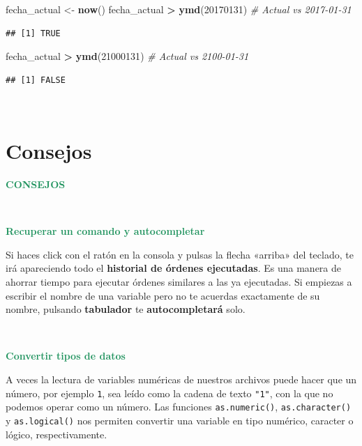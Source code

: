 \documentclass[11pt,]{book}
\newenvironment{Shaded}{\begin{snugshade}}{\end{snugshade}}
\newcommand{\CommentTok}[1]{\textcolor[rgb]{0.37,0.37,0.37}{\textit{#1}}}
\newcommand{\DecValTok}[1]{\textcolor[rgb]{0.06,0.06,0.06}{#1}}
\newcommand{\KeywordTok}[1]{\textcolor[rgb]{0.27,0.27,0.27}{\textbf{#1}}}
\newcommand{\NormalTok}[1]{#1}
\newcommand{\OperatorTok}[1]{\textcolor[rgb]{0.43,0.43,0.43}{\textbf{#1}}}
\newcommand{\StringTok}[1]{\textcolor[rgb]{0.5,0.5,0.5}{#1}}
\begin{document}
\begin{Shaded}
\begin{Highlighting}[]
\NormalTok{fecha_actual <-}\StringTok{ }\KeywordTok{now}\NormalTok{()}
\NormalTok{fecha_actual }\OperatorTok{>}\StringTok{ }\KeywordTok{ymd}\NormalTok{(}\DecValTok{20170131}\NormalTok{) }\CommentTok{# Actual vs 2017-01-31}
\end{Highlighting}
\end{Shaded}

\begin{verbatim}
## [1] TRUE
\end{verbatim}

\begin{Shaded}
\begin{Highlighting}[]
\NormalTok{fecha_actual }\OperatorTok{>}\StringTok{ }\KeywordTok{ymd}\NormalTok{(}\DecValTok{21000131}\NormalTok{) }\CommentTok{# Actual vs 2100-01-31}
\end{Highlighting}
\end{Shaded}

\begin{verbatim}
## [1] FALSE
\end{verbatim}

~

\hypertarget{consejos-2}{%
\section{Consejos}\label{consejos-2}}

\textbf{\textcolor{#20935E}{CONSEJOS}}

~

\textbf{\textcolor{#20935E}{Recuperar un comando y autocompletar}}

Si haces click con el ratón en la consola y pulsas la flecha «arriba» del teclado, te irá apareciendo todo el \textbf{historial de órdenes ejecutadas}. Es una manera de ahorrar tiempo para ejecutar órdenes similares a las ya ejecutadas. Si empiezas a escribir el nombre de una variable pero no te acuerdas exactamente de su nombre, pulsando \textbf{tabulador} te \textbf{autocompletará} solo.

~

\textbf{\textcolor{#20935E}{Convertir tipos de datos}}

A veces la lectura de variables numéricas de nuestros archivos puede hacer que un número, por ejemplo \texttt{1}, sea leído como la cadena de texto \texttt{"1"}, con la que no podemos operar como un número. Las funciones \texttt{as.numeric()}, \texttt{as.character()} y \texttt{as.logical()} nos permiten convertir una variable en tipo numérico, caracter o lógico, respectivamente.
\end{document}
